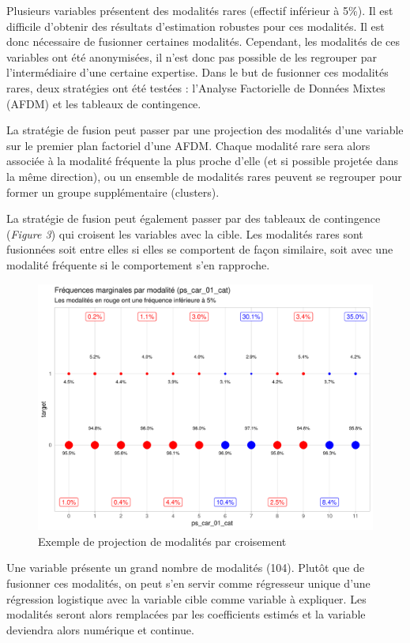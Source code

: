\documentclass[french]{article}
\begin{document}
\begin{multicols}{2}
Plusieurs variables présentent des modalités rares (effectif inférieur à 5\%). Il est difficile d'obtenir des résultats d'estimation robustes pour ces modalités. Il est donc nécessaire de fusionner certaines modalités. Cependant, les modalités de ces variables ont été anonymisées, il n'est donc pas possible de les regrouper par l'intermédiaire d'une certaine expertise. Dans le but de fusionner ces modalités rares, deux stratégies ont été testées :  l'Analyse Factorielle de Données Mixtes (AFDM) et les tableaux de contingence.

La stratégie de fusion peut passer par une projection des modalités d'une variable sur le premier plan factoriel d'une AFDM. Chaque modalité rare sera alors associée à la modalité fréquente la plus proche d'elle (et si possible projetée dans la même direction), ou un ensemble de modalités rares peuvent se regrouper pour former un groupe supplémentaire (clusters).

La stratégie de fusion peut également passer par des tableaux de contingence (\emph{Figure 3}) qui croisent les variables avec la cible. Les modalités rares sont fusionnées soit entre elles si elles se comportent de façon similaire, soit avec une modalité fréquente si le comportement s'en rapproche.

\begin{figure}[H] \centering
  \includegraphics[width = \columnwidth]{img/ex_tabc}
  \caption{Exemple de projection de modalités par croisement}
\end{figure}

Une variable présente un grand nombre de modalités (104). Plutôt que de fusionner ces modalités, on peut s'en servir comme régresseur unique d'une régression logistique avec la variable cible comme variable à expliquer. Les modalités seront alors remplacées par les coefficients estimés et la variable deviendra alors numérique et continue.


\end{multicols}
\end{document}
